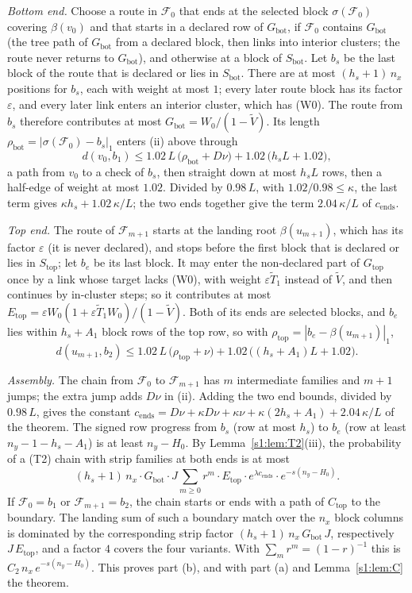\documentclass[11pt]{amsart}
\theoremstyle{definition}
\theoremstyle{remark}
\numberwithin{equation}{section}
\newcommand{\cF}{\mathcal{F}}
\newcommand{\eps}{\varepsilon}
\newcommand{\Ctop}{C_{\mathrm{top}}}
\newcommand{\Gbot}{G_{\mathrm{bot}}}
\newcommand{\Gtop}{G_{\mathrm{top}}}
\newcommand{\Sbot}{S_{\mathrm{bot}}}
\newcommand{\Stop}{S_{\mathrm{top}}}
\newcommand{\Tt}{\tilde T}
\begin{document}
\emph{Bottom end.} Choose a route in $\cF_0$ that ends at the selected block $\sigma(\cF_0)$ covering $\beta(v_0)$ and that starts in a declared row of $\Gbot$, if $\cF_0$ contains $\Gbot$ (the tree path of $\Gbot$ from a declared block, then links into interior clusters; the route never returns to $\Gbot$), and otherwise at a block of $\Sbot$. Let $b_s$ be the last block of the route that is declared or lies in $\Sbot$. There are at most $(h_s+1)\,n_x$ positions for $b_s$, each with weight at most $1$; every later route block has its factor $\eps$, and every later link enters an interior cluster, which has (W0). The route from $b_s$ therefore contributes at most $G_{\mathrm{bot}}=W_0/(1-\tilde V)$. Its length $\rho_{\mathrm{bot}}=|\sigma(\cF_0)-b_s|_1$ enters (ii) above through
\[
d(v_0,b_1)\le1.02\,L\,\bigl(\rho_{\mathrm{bot}}+D\nu\bigr)+1.02\,\bigl(h_sL+1.02\bigr),
\]
a path from $v_0$ to a check of $b_s$, then straight down at most $h_sL$ rows, then a half-edge of weight at most $1.02$. Divided by $0.98\,L$, with $1.02/0.98\le\kappa$, the last term gives $\kappa h_s+1.02\,\kappa/L$; the two ends together give the term $2.04\,\kappa/L$ of $c_{\mathrm{ends}}$.

\emph{Top end.} The route of $\cF_{m+1}$ starts at the landing root $\beta(u_{m+1})$, which has its factor $\eps$ (it is never declared), and stops before the first block that is declared or lies in $\Stop$; let $b_e$ be its last block. It may enter the non-declared part of $\Gtop$ once by a link whose target lacks (W0), with weight $\eps\Tt_1$ instead of $\tilde V$, and then continues by in-cluster steps; so it contributes at most $E_{\mathrm{top}}=\eps W_0(1+\eps\Tt_1W_0)/(1-\tilde V)$. Both of its ends are selected blocks, and $b_e$ lies within $h_s+A_1$ block rows of the top row, so with $\rho_{\mathrm{top}}=|b_e-\beta(u_{m+1})|_1$,
\[
d(u_{m+1},b_2)\le1.02\,L\,\bigl(\rho_{\mathrm{top}}+\nu\bigr)+1.02\,\bigl((h_s+A_1)L+1.02\bigr).
\]

\emph{Assembly.} The chain from $\cF_0$ to $\cF_{m+1}$ has $m$ intermediate families and $m+1$ jumps; the extra jump adds $D\nu$ in (ii). Adding the two end bounds, divided by $0.98\,L$, gives the constant $c_{\mathrm{ends}}=D\nu+\kappa D\nu+\kappa\nu+\kappa(2h_s+A_1)+2.04\,\kappa/L$ of the theorem. The signed row progress from $b_s$ (row at most $h_s$) to $b_e$ (row at least $n_y-1-h_s-A_1$) is at least $n_y-H_0$. By Lemma~\ref{s1:lem:T2}(iii), the probability of a (T2) chain with strip families at both ends is at most
\[
(h_s+1)\,n_x\cdot G_{\mathrm{bot}}\cdot J\sum_{m\ge0}r^m\cdot E_{\mathrm{top}}\cdot e^{\lambda c_{\mathrm{ends}}}\cdot e^{-s(n_y-H_0)} .
\]
If $\cF_0=b_1$ or $\cF_{m+1}=b_2$, the chain starts or ends with a path of $\Ctop$ to the boundary. The landing sum of such a boundary match over the $n_x$ block columns is dominated by the corresponding strip factor $(h_s+1)\,n_x\,G_{\mathrm{bot}}\,J$, respectively $J\,E_{\mathrm{top}}$, and a factor $4$ covers the four variants. With $\sum_mr^m=(1-r)^{-1}$ this is $C_2\,n_x\,e^{-s(n_y-H_0)}$. This proves part (b), and with part (a) and Lemma~\ref{s1:lem:C} the theorem.
\end{document}
